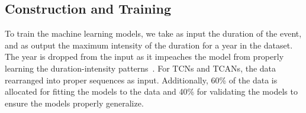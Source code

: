 \subsection{Construction and Training}


To train the machine learning models, we take as input the duration of the event, and as output the maximum intensity of the duration for a year in the dataset. The year is dropped from the input as it impeaches the model from properly learning the duration-intensity patterns~\cite{14}. For TCNs and TCANs, the data rearranged into proper sequences as input. Additionally, 60\% of the data is allocated for fitting the models to the data and 40\% for validating the models to ensure the models properly generalize.